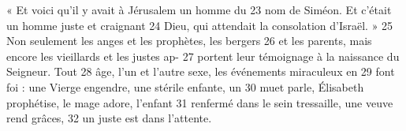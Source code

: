 « Et voici qu'il y avait à Jérusalem un homme du	 
23	 	nom de Siméon. Et c'était un homme juste et craignant	 
24	 	Dieu, qui attendait la consolation d'Israël. »	 
25	 	Non seulement les anges et les prophètes, les bergers	 
26	 	et les parents, mais encore les vieillards et les justes ap-	 
27	 	portent leur témoignage à la naissance du Seigneur. Tout	 
28	 	âge, l'un et l'autre sexe, les événements miraculeux en	 
29	 	font foi : une Vierge engendre, une stérile enfante, un	 
30	 	muet parle, Élisabeth prophétise, le mage adore, l'enfant	 
31	 	renfermé dans le sein tressaille, une veuve rend grâces,	 
32	 	un juste est dans l'attente.